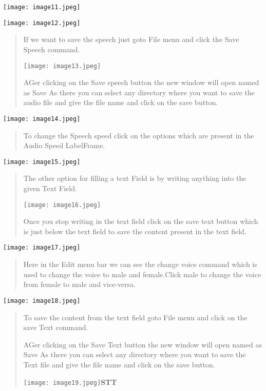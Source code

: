 \documentclass[]{article}
\begin{document}
\texttt{[image: image11.jpeg]}

\texttt{[image: image12.jpeg]}

\begin{quote}
If we want to save the speech just goto File menu and click the Save
Speech command.

\texttt{[image: image13.jpeg]}

AGer clicking on the Save speech button the new window will open named
as Save As there you can select any directory where you want to save the
audio ﬁle and give the ﬁle name and click on the save button.
\end{quote}

\texttt{[image: image14.jpeg]}

\begin{quote}
To change the Speech speed click on the options which are present in the
Audio Speed LabelFrame.
\end{quote}

\texttt{[image: image15.jpeg]}

\begin{quote}
The other option for ﬁlling a text Field is by writing anything into the
given Text Field.

\texttt{[image: image16.jpeg]}

Once you stop writing in the text ﬁeld click on the save text button
which is just below the text ﬁeld to save the content present in the
text ﬁeld.
\end{quote}

\texttt{[image: image17.jpeg]}

\begin{quote}
Here in the Edit menu bar we can see the change voice command which is
used to change the voice to male and female.Click male to change the
voice from female to male and vice-versa.
\end{quote}

\texttt{[image: image18.jpeg]}

\begin{quote}
To save the content from the text ﬁeld goto File menu and click on the
save Text command.

AGer clicking on the Save Text button the new window will open named as
Save As there you can select any directory where you want to save the
Text ﬁle and give the ﬁle name and click on the save button.

\texttt{[image: image19.jpeg]}\textbf{STT}
\end{quote}
\end{document}
